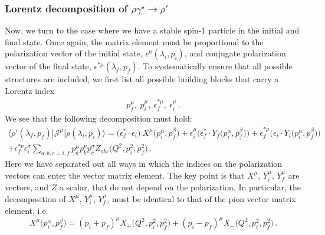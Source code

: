 {\subsubsection{Lorentz decomposition of $\rho\gamma^\star\to\rho'$}

{}

Now, we turn to the case where we have a stable spin-1 particle in the initial and final state. Once again, the matrix element must be proportional to the polarization vector of the initial state, $\epsilon^{\mu}(\lambda_i, p_i)$, and conjugate polarization vector of the final state, $\epsilon^{* \mu}(\lambda_f,p_f)$.  To systematically ensure that all possible structures are included, we first list all possible building blocks that carry a Lorentz index
\begin{gather}
p_f^\mu,\ p_i^\mu,\ \epsilon^{*\mu}_f,\ \epsilon_i^{\mu} \,.
\end{gather}
We see that the following decomposition must hold:
{\raul \begin{multline}
\langle\rho'(\lambda_f,p_f)|{\mathcal{J}}^{\mu}|\rho(\lambda_i,p_i)\rangle
=
\big ( \epsilon_f^*\cdot \epsilon_i \big ) \  {X}^\mu \big (p_i^\alpha,p_f^\beta \big)
+ \epsilon_i^\mu    \Big ( \epsilon_f^* \cdot {Y_f} \big (p_i^\alpha,p_f^\beta \big) \Big ) 
+ \epsilon_f^{*\mu}  \Big (  \epsilon_i \cdot {Y_i}  \big (p_i^\alpha,p_f^\beta \big)  \Big ) \\ 
+  \epsilon_f^{*\nu}   \epsilon_i^\sigma 
\sum_{a,b,c=i,f} p_a^\mu p_b^\nu p_c^\sigma Z_{abc} \big (Q^2, p_i^2,p_f^2 \big)
 \,.
\end{multline}}
 Here we have separated out all ways in which the indices on the polarization vectors can enter the vector matrix element. The key point is that $X^\mu$, $Y^\mu_i$, $Y^\mu_f$ are vectors, and $Z$ a scalar, that do not depend on the polarization. In particular, the decomposition of $X^\mu$, $Y_i^\mu$, $Y_f^\mu$, must be identical to that of the pion vector matrix element, i.e.
\begin{equation}
{X}^\mu \big (p_i^\alpha,p_f^\beta \big) = (p_i + p_f)^\mu X_+ \big (Q^2, p_i^2,p_f^2 \big) + (p_i - p_f)^\mu {X_-} \big (Q^2, p_i^2,p_f^2 \big) \,.
\end{equation}
%
%
{\mh

}}
